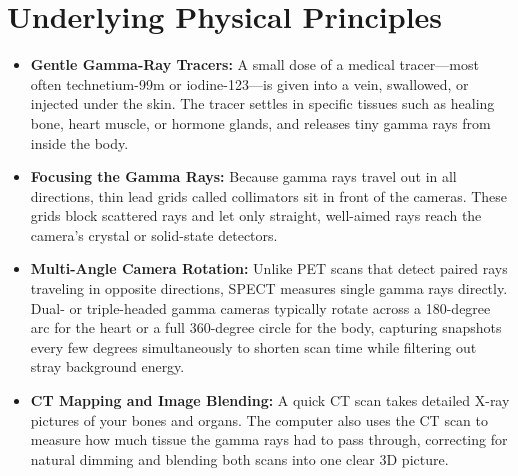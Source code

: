 \section{Underlying Physical Principles}
\begin{itemize}
    \item \textbf{Gentle Gamma-Ray Tracers:} A small dose of a medical tracer---most often technetium-99m or iodine-123---is given into a vein, swallowed, or injected under the skin. The tracer settles in specific tissues such as healing bone, heart muscle, or hormone glands, and releases tiny gamma rays from inside the body.
    \item \textbf{Focusing the Gamma Rays:} Because gamma rays travel out in all directions, thin lead grids called collimators sit in front of the cameras. These grids block scattered rays and let only straight, well-aimed rays reach the camera's crystal or solid-state detectors.
    \item \textbf{Multi-Angle Camera Rotation:} Unlike PET scans that detect paired rays traveling in opposite directions, SPECT measures single gamma rays directly. Dual- or triple-headed gamma cameras typically rotate across a 180-degree arc for the heart or a full 360-degree circle for the body, capturing snapshots every few degrees simultaneously to shorten scan time while filtering out stray background energy.
    \item \textbf{CT Mapping and Image Blending:} A quick CT scan takes detailed X-ray pictures of your bones and organs. The computer also uses the CT scan to measure how much tissue the gamma rays had to pass through, correcting for natural dimming and blending both scans into one clear 3D picture.
\end{itemize}

